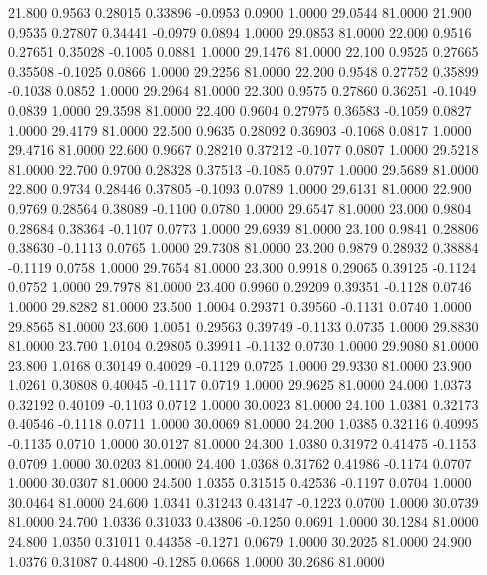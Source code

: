   21.800   0.9563   0.28015   0.33896  -0.0953   0.0900   1.0000  29.0544  81.0000
  21.900   0.9535   0.27807   0.34441  -0.0979   0.0894   1.0000  29.0853  81.0000
  22.000   0.9516   0.27651   0.35028  -0.1005   0.0881   1.0000  29.1476  81.0000
  22.100   0.9525   0.27665   0.35508  -0.1025   0.0866   1.0000  29.2256  81.0000
  22.200   0.9548   0.27752   0.35899  -0.1038   0.0852   1.0000  29.2964  81.0000
  22.300   0.9575   0.27860   0.36251  -0.1049   0.0839   1.0000  29.3598  81.0000
  22.400   0.9604   0.27975   0.36583  -0.1059   0.0827   1.0000  29.4179  81.0000
  22.500   0.9635   0.28092   0.36903  -0.1068   0.0817   1.0000  29.4716  81.0000
  22.600   0.9667   0.28210   0.37212  -0.1077   0.0807   1.0000  29.5218  81.0000
  22.700   0.9700   0.28328   0.37513  -0.1085   0.0797   1.0000  29.5689  81.0000
  22.800   0.9734   0.28446   0.37805  -0.1093   0.0789   1.0000  29.6131  81.0000
  22.900   0.9769   0.28564   0.38089  -0.1100   0.0780   1.0000  29.6547  81.0000
  23.000   0.9804   0.28684   0.38364  -0.1107   0.0773   1.0000  29.6939  81.0000
  23.100   0.9841   0.28806   0.38630  -0.1113   0.0765   1.0000  29.7308  81.0000
  23.200   0.9879   0.28932   0.38884  -0.1119   0.0758   1.0000  29.7654  81.0000
  23.300   0.9918   0.29065   0.39125  -0.1124   0.0752   1.0000  29.7978  81.0000
  23.400   0.9960   0.29209   0.39351  -0.1128   0.0746   1.0000  29.8282  81.0000
  23.500   1.0004   0.29371   0.39560  -0.1131   0.0740   1.0000  29.8565  81.0000
  23.600   1.0051   0.29563   0.39749  -0.1133   0.0735   1.0000  29.8830  81.0000
  23.700   1.0104   0.29805   0.39911  -0.1132   0.0730   1.0000  29.9080  81.0000
  23.800   1.0168   0.30149   0.40029  -0.1129   0.0725   1.0000  29.9330  81.0000
  23.900   1.0261   0.30808   0.40045  -0.1117   0.0719   1.0000  29.9625  81.0000
  24.000   1.0373   0.32192   0.40109  -0.1103   0.0712   1.0000  30.0023  81.0000
  24.100   1.0381   0.32173   0.40546  -0.1118   0.0711   1.0000  30.0069  81.0000
  24.200   1.0385   0.32116   0.40995  -0.1135   0.0710   1.0000  30.0127  81.0000
  24.300   1.0380   0.31972   0.41475  -0.1153   0.0709   1.0000  30.0203  81.0000
  24.400   1.0368   0.31762   0.41986  -0.1174   0.0707   1.0000  30.0307  81.0000
  24.500   1.0355   0.31515   0.42536  -0.1197   0.0704   1.0000  30.0464  81.0000
  24.600   1.0341   0.31243   0.43147  -0.1223   0.0700   1.0000  30.0739  81.0000
  24.700   1.0336   0.31033   0.43806  -0.1250   0.0691   1.0000  30.1284  81.0000
  24.800   1.0350   0.31011   0.44358  -0.1271   0.0679   1.0000  30.2025  81.0000
  24.900   1.0376   0.31087   0.44800  -0.1285   0.0668   1.0000  30.2686  81.0000
